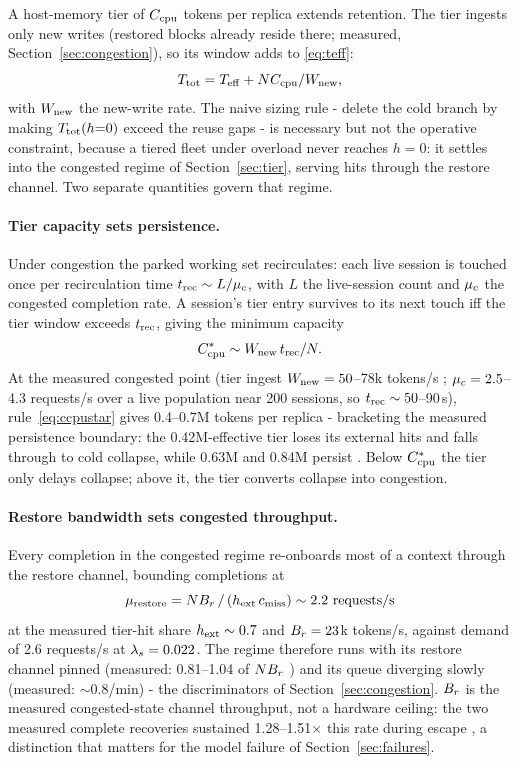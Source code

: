 A host-memory tier of $C_{\mathrm{cpu}}$ tokens per replica extends retention.
The tier ingests only new writes (restored blocks already reside
there; measured, Section~\ref{sec:congestion}), so its window adds to \eqref{eq:teff}:
\begin{equation}
T_{\mathrm{tot}} = T_{\mathrm{eff}} + N C_{\mathrm{cpu}} / W_{\mathrm{new}},
\label{eq:ttot}
\end{equation}
with $W_{\mathrm{new}}$ the new-write rate. The naive sizing rule - delete the
cold branch by making $T_{\mathrm{tot}}(h{=}0)$ exceed the reuse gaps - is
necessary but not the operative constraint, because a tiered fleet
under overload never reaches $h = 0$: it settles into the congested
regime of Section~\ref{sec:tier}, serving hits through the restore channel. Two
separate quantities govern that regime.

\paragraph{Tier capacity sets persistence.} Under congestion the parked working
set recirculates: each live session is touched once per
recirculation time $t_{\mathrm{rec}} \sim L / \mu_c$, with $L$ the live-session count
and $\mu_c$ the congested completion rate. A session's tier entry
survives to its next touch iff the tier window exceeds $t_{\mathrm{rec}}$, giving
the minimum capacity
\begin{equation}
C_{\mathrm{cpu}}^* \sim W_{\mathrm{new}}\, t_{\mathrm{rec}} / N.
\label{eq:ccpustar}
\end{equation}
At the measured congested point (tier ingest $W_{\mathrm{new}} = 50$--78k
tokens/s ; $\mu_c = 2.5$--4.3 requests/s over a live population near
200 sessions, so $t_{\mathrm{rec}} \sim 50$--90\,s), rule~\eqref{eq:ccpustar} gives 0.4--0.7M tokens
per replica - bracketing the measured persistence boundary: the
0.42M-effective tier loses its external hits and falls through to
cold collapse, while 0.63M and 0.84M persist . Below $C_{\mathrm{cpu}}^*$ the
tier only delays collapse; above it, the tier converts collapse into
congestion.

\paragraph{Restore bandwidth sets congested throughput.} Every completion in the
congested regime re-onboards most of a context through the restore
channel, bounding completions at
\begin{equation}
\mu_{\mathrm{restore}} = N B_r \,/\, (h_{\mathrm{ext}}\, c_{\mathrm{miss}}) \sim 2.2 \text{ requests/s}
\label{eq:murestore}
\end{equation}
at the measured tier-hit share $h_{\mathrm{ext}} \sim 0.7$ and $B_r = 23$k tokens/s,
against demand of 2.6 requests/s at $\lambda_s = 0.022$. The regime
therefore runs with its restore channel pinned (measured: 0.81--1.04
of $N B_r$ ) and its queue diverging slowly (measured:
$\sim$0.8/min) - the discriminators of Section~\ref{sec:congestion}. $B_r$ is the measured
congested-state channel throughput, not a hardware ceiling: the two
measured complete recoveries sustained 1.28--1.51$\times$ this rate during
escape , a distinction that matters for the model failure of
Section~\ref{sec:failures}.

